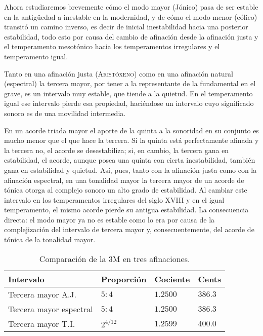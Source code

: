 \documentclass[a4paper,11pt]{article}
\begin{document}
\begin{multicols}{2}
  Ahora estudiaremos brevemente cómo el modo mayor (Jónico) pasa de ser estable en la antigüedad a inestable en la modernidad, y de cómo el modo menor (eólico) transitó un camino inverso, es decir de inicial inestabilidad hacia una posterior estabilidad, todo esto por causa del cambio de afinación desde la afinación justa y el temperamento mesotónico hacia los temperamentos irregulares y el temperamento igual.

  Tanto en una afinación justa (\textsc{Aristóxeno}) como en una afinación natural (espectral) la tercera mayor, por tener a la representante de la fundamental en el grave, es un intervalo muy estable, que tiende a la quietud. En el temperamento igual ese intervalo pierde esa propiedad, haciéndose un intervalo cuyo significado sonoro es de una movilidad intermedia.

  En un acorde triada mayor el aporte de la quinta a la sonoridad en su conjunto es mucho menor que el que hace la tercera. Si la quinta está perfectamente afinada y la tercera no, el acorde se desestabiliza; si, en cambio, la tercera gana en estabilidad, el acorde, aunque posea una quinta con cierta inestabilidad, también gana en estabilidad y quietud. Así, pues, tanto con la afinación justa como con la afinación espectral, en una tonalidad mayor la tercera mayor de un acorde de tónica otorga al complejo sonoro un alto grado de estabilidad. Al cambiar este intervalo en los temperamentos irregulares del siglo XVIII y en el igual temperamento, el mismo acorde pierde su antigua estabilidad. La consecuencia directa: el modo mayor ya no es estable como lo era por causa de la complejización del intervalo de tercera mayor y, consecuentemente, del acorde de tónica de la tonalidad mayor.
\end{multicols}

\begin{table}[ht]
  \centering
  \caption{Comparación de la 3M en tres afinaciones.}\label{tab:3M}
  \begin{tabular}{@{}llll@{}}
  \toprule
  Intervalo               & Proporción  & Cociente  & Cents   \\ \midrule
  Tercera mayor A.J.      & $5:4$       & $1.2500$  & $386.3$ \\
  Tercera mayor espectral & $5:4$       & $1.2500$  & $386.3$ \\
  Tercera mayor T.I.      & $2^{4/12}$  & $1.2599$  & $400.0$ \\ \bottomrule
  \end{tabular}
\end{table}
\end{document}
